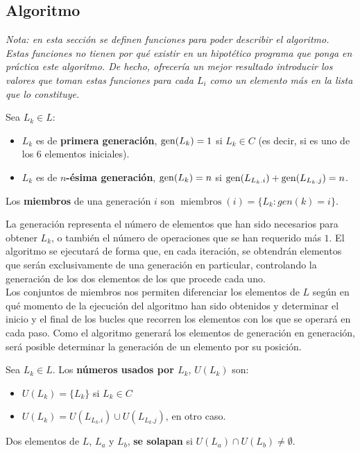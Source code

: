 \subsection{Algoritmo}

\emph{Nota: en esta sección se definen funciones para poder describir el algoritmo.
Estas funciones no tienen por qué existir en un hipotético programa que ponga en
práctica este algoritmo. De hecho, ofrecería un mejor resultado introducir los
valores que toman estas funciones para cada $L_i$ como un elemento más en la
lista que lo constituye.}

\begin{definition}
  Sea $L_k \in L$:
  \begin{itemize}
    \item $L_k$ es de \textbf{primera generación}, $\operatorname{gen}(L_k) = 1$ si $L_k \in C$
    (es decir, si es uno de los 6 elementos iniciales).
    \item $L_k$ es de \textbf{$n$-ésima generación}, $\operatorname{gen}(L_k) = n$ si $\operatorname{gen}(L_{L_k.i}) + \operatorname{gen}(L_{L_k.j}) = n$.
  \end{itemize}
  Los \textbf{miembros} de una generación $i$ son $\operatorname{miembros}(i) = \{L_k : gen(k) = i\}$.
\end{definition}

La generación representa el número de elementos que han sido necesarios
para obtener $L_k$, o también el número de operaciones que se han
requerido más $1$.
El algoritmo se ejecutará de forma que, en cada iteración, se obtendrán
elementos que serán exclusivamente de una generación en particular,
controlando la generación de los dos elementos de los que procede cada uno.\\

Los conjuntos de miembros nos permiten diferenciar los elementos de $L$ según en
qué momento de la ejecución del algoritmo han sido obtenidos y determinar el
inicio y el final de los bucles que recorren los elementos con los que se operará
en cada paso. Como el algoritmo generará los elementos de generación en generación,
será posible determinar la generación de un elemento por su posición.

\begin{definition}
  Sea $L_k \in L$. Los \textbf{números usados por $L_k$}, $U(L_k)$ son:
  \begin{itemize}
    \item $U(L_k) = \{ L_k\}$ si $L_k \in C$
    \item $U(L_k) = U(L_{L_k.i}) \cup U(L_{L_k.j})$, en otro caso.
  \end{itemize}
  Dos elementos de $L$, $L_a$ y $L_b$, \textbf{se solapan} si
  $U(L_a) \cap  U(L_b) \ne \emptyset$.
\end{definition}


